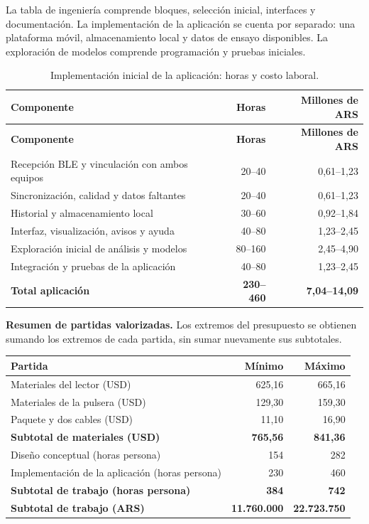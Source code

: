 La tabla de ingeniería comprende bloques, selección inicial, interfaces y documentación. La implementación de la aplicación se cuenta por separado: una plataforma móvil, almacenamiento local y datos de ensayo disponibles. La exploración de modelos comprende programación y pruebas iniciales.
{\footnotesize
\setlength{\tabcolsep}{4pt}
\renewcommand{\arraystretch}{1.18}
\begin{xltabular}{\linewidth}{@{}>{\raggedright\arraybackslash}X r r@{}}
\caption{Implementación inicial de la aplicación: horas y costo laboral.}\label{tab:costo-app}\\
\toprule
\textbf{Componente} & \textbf{Horas} & \textbf{Millones de ARS}\\
\midrule
\endfirsthead
\toprule
\textbf{Componente} & \textbf{Horas} & \textbf{Millones de ARS}\\
\midrule
\endhead
\bottomrule\endfoot

Recepción BLE y vinculación con ambos equipos & 20--40 & 0,61--1,23\\
Sincronización, calidad y datos faltantes & 20--40 & 0,61--1,23\\
Historial y almacenamiento local & 30--60 & 0,92--1,84\\
Interfaz, visualización, avisos y ayuda & 40--80 & 1,23--2,45\\
Exploración inicial de análisis y modelos & 80--160 & 2,45--4,90\\
Integración y pruebas de la aplicación & 40--80 & 1,23--2,45\\
\midrule
\textbf{Total aplicación} & \textbf{230--460} & \textbf{7,04--14,09}\\
\bottomrule
\end{xltabular}
}

\noindent\textbf{Resumen de partidas valorizadas.}
Los extremos del presupuesto se obtienen sumando los extremos de cada partida, sin sumar nuevamente sus subtotales.

{\small
\renewcommand{\arraystretch}{1.2}
\noindent\begin{tabularx}{\linewidth}{|>{\raggedright\arraybackslash}X|r|r|}
\hline
\textbf{Partida} & \textbf{Mínimo} & \textbf{Máximo}\\\hline
Materiales del lector (USD) & 625,16 & 665,16\\\hline
Materiales de la pulsera (USD) & 129,30 & 159,30\\\hline
Paquete y dos cables (USD) & 11,10 & 16,90\\\hline
\textbf{Subtotal de materiales (USD)} & \textbf{765,56} & \textbf{841,36}\\\hline
Diseño conceptual (horas persona) & 154 & 282\\\hline
Implementación de la aplicación (horas persona) & 230 & 460\\\hline
\textbf{Subtotal de trabajo (horas persona)} & \textbf{384} & \textbf{742}\\\hline
\textbf{Subtotal de trabajo (ARS)} & \textbf{11.760.000} & \textbf{22.723.750}\\\hline
\end{tabularx}
}

